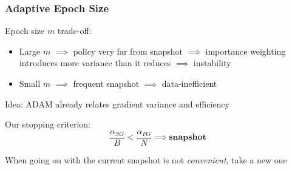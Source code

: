 \documentclass[aspectratio=169]{beamer}
\begin{document}
\begin{frame} 
\frametitle{Adaptive Epoch Size} 
Epoch size $m$ trade-off:
\begin{itemize}
	\item Large $m$ $\implies$ policy very far from snapshot $\implies$ importance weighting introduces more variance than it reduces $\implies$ instability
	\item Small $m$ $\implies$ frequent snapshot $\implies$ data-inefficient
\end{itemize}
\vfill

Idea: ADAM already relates gradient variance and efficiency\\
\vfill

Our stopping criterion:
\begin{equation*}
\frac{\alpha_{SG}}{B} < \frac{\alpha_{FG}}{N} \implies \textbf{snapshot}
\end{equation*}
\vfill

When going on with the current snapshot is not \textit{convenient}, take a new one
\end{frame}
\end{document}

